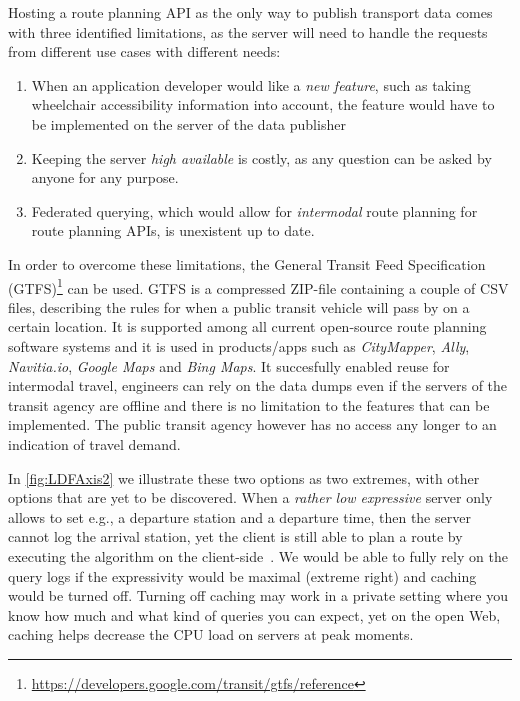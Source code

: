 \documentclass{sig-alternate}
\begin{document}
Hosting a route planning API as the only way to publish transport data comes with three identified limitations, as the server will need to handle the requests from different use cases with different needs:
\begin{enumerate}
  \item When an application developer would like a \emph{new feature}, such as taking wheelchair accessibility information into account, the feature would have to be implemented on the server of the data publisher
  \item Keeping the server \emph{high available} is costly, as any question can be asked by anyone for any purpose.
  \item Federated querying, which would allow for \emph{intermodal} route planning for route planning APIs, is unexistent up to date.
\end{enumerate}

In order to overcome these limitations, the General Transit Feed Specification (GTFS)\footnote{\url{https://developers.google.com/transit/gtfs/reference}} can be used. 
GTFS is a compressed ZIP-file containing a couple of CSV files, describing the rules for when a public transit vehicle will pass by on a certain location.
It is supported among all current open-source route planning software systems and it is used in products/apps such as \emph{CityMapper}, \emph{Ally}, \emph{Navitia.io}, \emph{Google Maps} and \emph{Bing Maps}.
It succesfully enabled reuse for intermodal travel, engineers can rely on the data dumps even if the servers of the transit agency are offline and there is no limitation to the features that can be implemented.
The public transit agency however has no access any longer to an indication of travel demand.

In \cref{fig:LDFAxis2} we illustrate these two options as two extremes, with other options that are yet to be discovered.
When a \emph{rather low expressive} server only allows to set e.g., a departure station and a departure time, then the server cannot log the arrival station, yet the client is still able to plan a route by executing the algorithm on the client-side~\cite{lc}.
We would be able to fully rely on the query logs if the expressivity would be maximal (extreme right) and caching would be turned off. 
Turning off caching may work in a private setting where you know how much and what kind of queries you can expect, yet on the open Web, caching helps decrease the CPU load on servers at peak moments.
\end{document}
